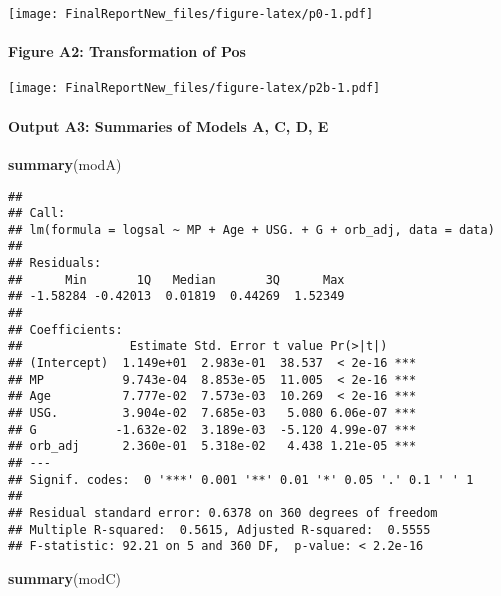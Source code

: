 \documentclass[]{article}
\newenvironment{Shaded}{\begin{snugshade}}{\end{snugshade}}
\newcommand{\KeywordTok}[1]{\textcolor[rgb]{0.13,0.29,0.53}{\textbf{#1}}}
\newcommand{\NormalTok}[1]{#1}
\let\oldparagraph\paragraph
\renewcommand{\paragraph}[1]{\oldparagraph{#1}\mbox{}}
\begin{document}
\texttt{[image: FinalReportNew\_files/figure-latex/p0-1.pdf]}

\paragraph{Figure A2: Transformation of
Pos}\label{figure-a2-transformation-of-pos}

\texttt{[image: FinalReportNew\_files/figure-latex/p2b-1.pdf]}

\paragraph{Output A3: Summaries of Models A, C, D,
E}\label{output-a3-summaries-of-models-a-c-d-e}

\begin{Shaded}
\begin{Highlighting}[]
\KeywordTok{summary}\NormalTok{(modA)}
\end{Highlighting}
\end{Shaded}

\begin{verbatim}
## 
## Call:
## lm(formula = logsal ~ MP + Age + USG. + G + orb_adj, data = data)
## 
## Residuals:
##      Min       1Q   Median       3Q      Max 
## -1.58284 -0.42013  0.01819  0.44269  1.52349 
## 
## Coefficients:
##               Estimate Std. Error t value Pr(>|t|)    
## (Intercept)  1.149e+01  2.983e-01  38.537  < 2e-16 ***
## MP           9.743e-04  8.853e-05  11.005  < 2e-16 ***
## Age          7.777e-02  7.573e-03  10.269  < 2e-16 ***
## USG.         3.904e-02  7.685e-03   5.080 6.06e-07 ***
## G           -1.632e-02  3.189e-03  -5.120 4.99e-07 ***
## orb_adj      2.360e-01  5.318e-02   4.438 1.21e-05 ***
## ---
## Signif. codes:  0 '***' 0.001 '**' 0.01 '*' 0.05 '.' 0.1 ' ' 1
## 
## Residual standard error: 0.6378 on 360 degrees of freedom
## Multiple R-squared:  0.5615, Adjusted R-squared:  0.5555 
## F-statistic: 92.21 on 5 and 360 DF,  p-value: < 2.2e-16
\end{verbatim}

\begin{Shaded}
\begin{Highlighting}[]
\KeywordTok{summary}\NormalTok{(modC)}
\end{Highlighting}
\end{Shaded}
\end{document}
